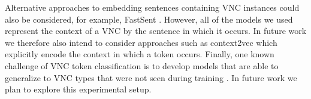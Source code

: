 \documentclass[11pt,a4paper]{article}
\begin{document}

Alternative approaches to embedding sentences containing VNC
instances could also be considered, for example, FastSent
\citep{Hill+:2016}. However, all of the models we used represent the
context of a VNC by the sentence in which it occurs. In future work we
therefore also intend to consider approaches such as context2vec
\citep{melamud2016context2vec} which explicitly encode the context in
which a token occurs. Finally, one known challenge of VNC token
classification is to develop models that are able to generalize to VNC
types that were not seen during training \citep{gharbieh+:2016}. In
future work we plan to explore this experimental setup.




\end{document}
